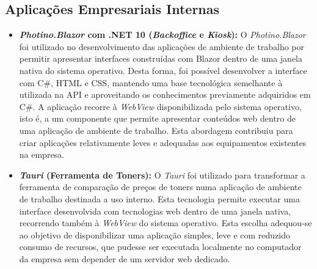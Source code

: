 \subsection{Aplicações Empresariais Internas}
\begin{itemize}
    \item \textbf{\textit{Photino.Blazor} com .NET 10 (\textit{Backoffice} e \textit{Kiosk}):} O \textit{Photino.Blazor} foi utilizado no desenvolvimento das aplicações de ambiente de trabalho por permitir apresentar interfaces construídas com Blazor dentro de uma janela nativa do sistema operativo. Desta forma, foi possível desenvolver a interface com C\#, HTML e CSS, mantendo uma base tecnológica semelhante à utilizada na \ac{API} e aproveitando os conhecimentos previamente adquiridos em C\#. A aplicação recorre à \textit{WebView} disponibilizada pelo sistema operativo, isto é, a um componente que permite apresentar conteúdos web dentro de uma aplicação de ambiente de trabalho. Esta abordagem contribuiu para criar aplicações relativamente leves e adequadas aos equipamentos existentes na empresa.
    \item \textbf{\textit{Tauri} (Ferramenta de Toners):} O \textit{Tauri} foi utilizado para transformar a ferramenta de comparação de preços de toners numa aplicação de ambiente de trabalho destinada a uso interno. Esta tecnologia permite executar uma interface desenvolvida com tecnologias web dentro de uma janela nativa, recorrendo também à \textit{WebView} do sistema operativo. Esta escolha adequou-se ao objetivo de disponibilizar uma aplicação simples, leve e com reduzido consumo de recursos, que pudesse ser executada localmente no computador da empresa sem depender de um servidor web dedicado.
\end{itemize}

